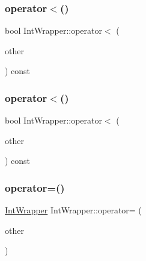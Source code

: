 \mbox{\label{class_int_wrapper_a940fd2978cdf7849281f11b32df94163}} 
\subsubsection{\texorpdfstring{operator$<$()}{operator<()}\hspace{0.1cm}{\footnotesize\ttfamily [2/3]}}
{\footnotesize\ttfamily bool Int\+Wrapper\+::operator$<$ (\begin{DoxyParamCaption}\item[{const \mbox{\hyperlink{class_int_wrapper}{Int\+Wrapper}} \&}]{other }\end{DoxyParamCaption}) const\hspace{0.3cm}{\ttfamily [inline]}}

\mbox{\label{class_int_wrapper_a940fd2978cdf7849281f11b32df94163}} 
\subsubsection{\texorpdfstring{operator$<$()}{operator<()}\hspace{0.1cm}{\footnotesize\ttfamily [3/3]}}
{\footnotesize\ttfamily bool Int\+Wrapper\+::operator$<$ (\begin{DoxyParamCaption}\item[{const \mbox{\hyperlink{class_int_wrapper}{Int\+Wrapper}} \&}]{other }\end{DoxyParamCaption}) const\hspace{0.3cm}{\ttfamily [inline]}}

\mbox{\label{class_int_wrapper_a39077b3c0eb1dd8a296a81bfb0a047b3}} 
\subsubsection{\texorpdfstring{operator=()}{operator=()}\hspace{0.1cm}{\footnotesize\ttfamily [1/3]}}
{\footnotesize\ttfamily \mbox{\hyperlink{class_int_wrapper}{Int\+Wrapper}} Int\+Wrapper\+::operator= (\begin{DoxyParamCaption}\item[{const \mbox{\hyperlink{class_int_wrapper}{Int\+Wrapper}} \&}]{other }\end{DoxyParamCaption})\hspace{0.3cm}{\ttfamily [inline]}}


